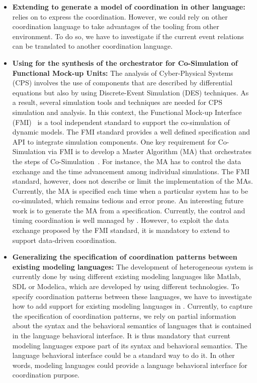 \begin{itemize}
	\item \textbf{Extending \bcool to generate a model of coordination in other language:} \bcool relies on \ccsl to express the coordination. However, we could rely on other coordination language to take advantages of the tooling from other environment. To do so, we have to investigate if the current event relations can be translated to another coordination language.
	
	\item \textbf{Using \bcool for the synthesis of the orchestrator for Co-Simulation of Functional Mock-up Units:} The analysis of Cyber-Physical Systems (CPS) involves the use of components that are described by differential equations but also by using Discrete-Event Simulation (DES) techniques. As a result, several simulation tools and techniques are needed for CPS simulation and analysis. In this context, the Functional Mock-up Interface (FMI)~\cite{fmibib2} is a tool independent standard to support the co-simulation of dynamic models. The FMI standard provides a well defined specification and API to integrate simulation components. One key requirement for Co-Simulation via FMI is to develop a Master Algorithm (MA) that orchestrates the steps of Co-Simulation~\cite{fmibib}. For instance, the MA has to control the data exchange and the time advancement among individual simulations. The FMI standard, however, does not describe or limit the implementation of the MAs. Currently, the MA is specified each time when a particular system has to be co-simulated, which remains tedious and error prone. An interesting future work is to generate the MA from a \bcool specification. Currently, the control and timing coordination is well managed by \bcool. However, to exploit the data exchange proposed by the FMI standard, it is mandatory to extend \bcool to support data-driven coordination. 
	
	\item \textbf{Generalizing the specification of coordination patterns between existing modeling languages:} The development of heterogeneous system is currently done by using different existing modeling languages like Matlab, SDL or Modelica, which are developed by using different technologies. To specify coordination patterns between these languages, we have to investigate how to add support for existing modeling languages in \bcool. Currently, to capture the specification of coordination patterns, we rely on partial information about the syntax and the behavioral semantics of languages that is contained in the language behavioral interface. It is thus mandatory that current modeling languages expose part of its syntax and behavioral semantics. The language behavioral interface could be a standard way to do it. In other words, modeling languages could provide a language behavioral interface for coordination purpose. %
				

\end{itemize}
